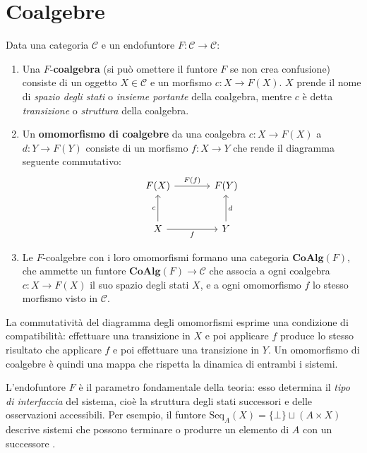 \chapter{Coalgebre}

\begin{definition}[Coalgebra]
  Data una categoria \(\mathcal{C}\) e un endofuntore \(F: \mathcal{C} \to \mathcal{C}\):
  \begin{enumerate}
    \item Una \(F\)-\textbf{coalgebra} (si può omettere il funtore \(F\) se non crea confusione) consiste di un oggetto \(X\in\mathcal{C}\) e un morfismo \(c:X \to F(X)\). \(X\) prende il nome di \textit{spazio degli stati} o \textit{insieme portante} della coalgebra, mentre \(c\) è detta \textit{transizione} o \textit{struttura} della coalgebra.
    \item Un \textbf{omomorfismo di coalgebre} da una coalgebra \(c: X \to F(X)\) a \(d: Y \to F(Y)\) consiste di un morfismo \(f: X \to Y\) che rende il diagramma seguente commutativo:
          \[
            \begin{tikzcd}[column sep=large, row sep=large]
              F(X) \arrow[r, "F(f)"] & F(Y) \\
              X \arrow[u, "c"] \arrow[r, "f"'] & Y \arrow[u, "d"']
            \end{tikzcd}
          \]
    \item Le \(F\)-coalgebre con i loro omomorfismi formano una categoria \(\mathbf{CoAlg}(F)\), che ammette un funtore \(\mathbf{CoAlg}(F) \to \mathcal{C}\) che associa a ogni coalgebra \(c: X \to F(X)\) il suo spazio degli stati \(X\), e a ogni omomorfismo \(f\) lo stesso morfismo visto in \(\mathcal{C}\).
  \end{enumerate}
\end{definition}

La commutatività del diagramma degli omomorfismi esprime una condizione di compatibilità: effettuare una transizione in \(X\) e poi applicare \(f\) produce lo stesso risultato che applicare \(f\) e poi effettuare una transizione in \(Y\). Un omomorfismo di coalgebre è quindi una mappa che rispetta la dinamica di entrambi i sistemi.

L'endofuntore \(F\) è il parametro fondamentale della teoria: esso determina il \textit{tipo di interfaccia} del sistema, cioè la struttura degli stati successori e delle osservazioni accessibili. Per esempio, il funtore \(\mathrm{Seq}_A(X) = \{\bot\} \sqcup (A \times X)\) descrive sistemi che possono terminare o produrre un elemento di \(A\) con un successore \cite{jacobs2017}.

